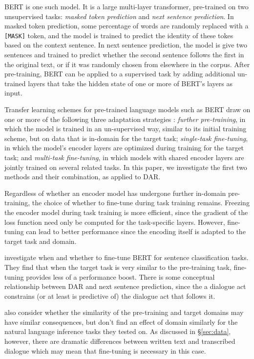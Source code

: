 \documentclass[11pt,a4paper]{article}
\begin{document}
BERT \citep{devlinBERTPretrainingDeep2018} is one such model. 
It is a large multi-layer transformer, pre-trained on two unsupervised tasks: \emph{masked token prediction} and \emph{next sentence prediction}.
In masked token prediction, some percentage of words are randomly replaced with a \texttt{[MASK]} token, and the model is trained to predict the identity of these tokes based on the context sentence.
In next sentence prediction, the model is give two sentences and trained to predict whether the second sentence follows the first in the original text, or if it was randomly chosen from elsewhere in the corpus.
After pre-training, BERT can be applied to a supervised task by adding additional un-trained layers that take the hidden state of one or more of BERT's layers as input. 

Transfer learning schemes for pre-trained language models such as BERT draw on one or more of the following three adaptation strategies \citet{sunHowFineTuneBERT2019}:
\emph{further pre-training}, in which the model is trained in an un-supervised way, similar to its initial training scheme, but on data that is in-domain for the target task; 
\emph{single-task fine-tuning}, in which the model's encoder layers are optimized during training for the target task;
and \emph{multi-task fine-tuning}, in which models with shared encoder layers are jointly trained on several related tasks.
In this paper, we investigate the first two methods and their combination, as applied to DAR.

Regardless of whether an encoder model has undergone further in-domain pre-training, the choice of whether to fine-tune during task training remains.
Freezing the encoder model during task training is more efficient, since the gradient of the loss function need only be computed for the task-specific layers.
However, fine-tuning can lead to better performance since the encoding itself is adapted to the target task and domain.

\citet{petersTuneNotTune2019} investigate when and whether to fine-tune BERT for sentence classification tasks.
They find that when the target task is very similar to the pre-training task, fine-tuning provides less of a performance boost.
There is some conceptual relationship between DAR and next sentence prediction, since the a dialogue act constrains (or at least is predictive of) the dialogue act that follows it.

\citet{petersTuneNotTune2019} also consider whether the similarity of the pre-training and target domains may have similar consequences, but don't find an effect of domain similarly for the natural language inference tasks they tested on.
As discussed in \S\ref{sec:data}, however, there are dramatic differences between written text and transcribed dialogue which may mean that fine-tuning is necessary in this case.
\end{document}
